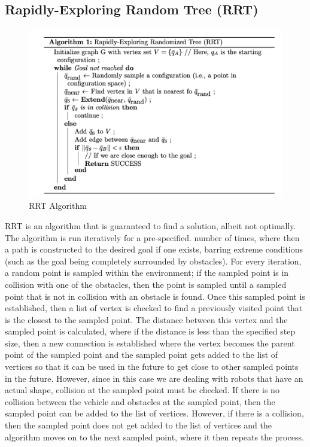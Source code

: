 \documentclass[10pt,letterpaper]{article}
\begin{document}
\subsection{Rapidly-Exploring Random Tree (RRT)}

\begin{figure}[!h]
    \centering
    \includegraphics[width= 11 cm]{figures/rrt.png}
    \caption{RRT Algorithm }
    \label{fig: rrt}
\end{figure}

\noindent RRT is an algorithm that is guaranteed to find a solution, albeit not optimally. The algorithm is run iteratively for a pre-specified. number of times, where then a path is constructed to the desired goal if one exists, barring extreme conditions (such as the goal being completely surrounded by obstacles). For every iteration, a random point is sampled within the environment; if the sampled point is in collision with one of the obstacles, then the point is sampled until a sampled point that is not in collision with an obstacle is found. Once this sampled point is established, then a list of vertex is checked to find a previously visited point that is the closest to the sampled point. The distance between this vertex and the sampled point is calculated, where if the distance is less than the specified step size, then a new connection is established where the vertex becomes the parent point of the sampled point and the sampled point gets added to the list of vertices so that it can be used in the future to get close to other sampled points in the future. However, since in this case we are dealing with robots that have an actual shape, collision at the sampled point must be checked. If there is no collision between the vehicle and obstacles at the sampled point, then the sampled point can be added to the list of vertices. However, if there is a collision, then the sampled point does not get added to the list of vertices and the algorithm moves on to the next sampled point, where it then repeats the process.\\
\end{document}
